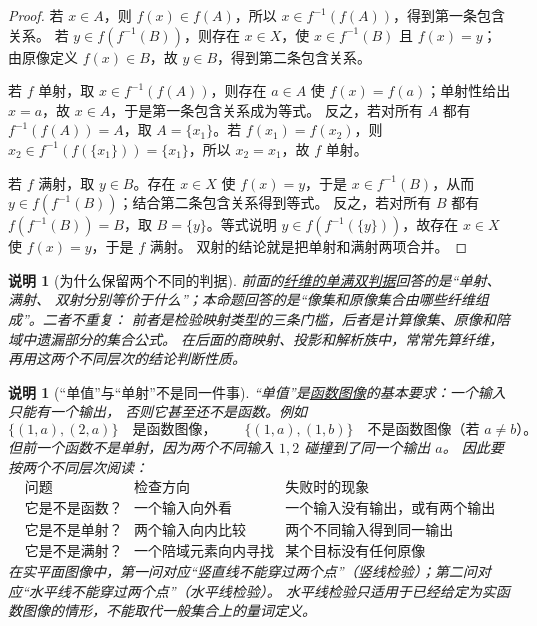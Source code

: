 \documentclass[UTF8,fontset=none,a4paper,11pt]{ctexart}
\theoremstyle{foundation-definition}
\theoremstyle{foundation-theorem}
\theoremstyle{foundation-proposition}
\theoremstyle{foundation-example}
\theoremstyle{foundation-remark}
\newtheorem{remark}[definition]{说明}
\theoremstyle{foundation-theorem}
\newcommand{\term}[2]{\hyperref[#1]{#2}}
\begin{document}
\begin{proof}
若 \(x\in A\)，则 \(f(x)\in f(A)\)，所以 \(x\in f^{-1}(f(A))\)，得到第一条包含关系。
若 \(y\in f(f^{-1}(B))\)，则存在 \(x\in X\)，使 \(x\in f^{-1}(B)\) 且 \(f(x)=y\)；
由原像定义 \(f(x)\in B\)，故 \(y\in B\)，得到第二条包含关系。

若 \(f\) 单射，取 \(x\in f^{-1}(f(A))\)，则存在 \(a\in A\) 使
\(f(x)=f(a)\)；单射性给出 \(x=a\)，故 \(x\in A\)，于是第一条包含关系成为等式。
反之，若对所有 \(A\) 都有 \(f^{-1}(f(A))=A\)，取
\(A=\{x_1\}\)。若 \(f(x_1)=f(x_2)\)，则
\(x_2\in f^{-1}(f(\{x_1\}))=\{x_1\}\)，所以 \(x_2=x_1\)，故 \(f\) 单射。

若 \(f\) 满射，取 \(y\in B\)。存在 \(x\in X\) 使 \(f(x)=y\)，于是
\(x\in f^{-1}(B)\)，从而 \(y\in f(f^{-1}(B))\)；结合第二条包含关系得到等式。
反之，若对所有 \(B\) 都有 \(f(f^{-1}(B))=B\)，取 \(B=\{y\}\)。等式说明
\(y\in f(f^{-1}(\{y\}))\)，故存在 \(x\in X\) 使 \(f(x)=y\)，于是 \(f\) 满射。
双射的结论就是把单射和满射两项合并。
\end{proof}

\begin{remark}[为什么保留两个不同的判据]
前面的\term{prop:fiber-single-surj-bijective}{纤维的单满双判据}回答的是“单射、满射、
双射分别等价于什么”；本命题回答的是“像集和原像集合由哪些纤维组成”。二者不重复：
前者是检验映射类型的三条门槛，后者是计算像集、原像和陪域中遗漏部分的集合公式。
在后面的商映射、投影和解析族中，常常先算纤维，再用这两个不同层次的结论判断性质。
\end{remark}

\begin{remark}[“单值”与“单射”不是同一件事]
“单值”是\term{def:function-graph-formal}{函数图像}的基本要求：一个输入只能有一个输出，
否则它甚至还不是函数。例如
\[
  \{(1,a),(2,a)\}\quad\text{是函数图像，}
  \qquad
  \{(1,a),(1,b)\}\quad\text{不是函数图像（若 }a\ne b\text{）。}
\]
但前一个函数不是单射，因为两个不同输入 \(1,2\) 碰撞到了同一个输出 \(a\)。
因此要按两个不同层次阅读：
\[
\begin{array}{c|c|c}
\text{问题}&\text{检查方向}&\text{失败时的现象}\\
\hline
\text{它是不是函数？}&\text{一个输入向外看}&\text{一个输入没有输出，或有两个输出}\\
\text{它是不是单射？}&\text{两个输入向内比较}&\text{两个不同输入得到同一输出}\\
\text{它是不是满射？}&\text{一个陪域元素向内寻找}&\text{某个目标没有任何原像}
\end{array}
\]
在实平面图像中，第一问对应“竖直线不能穿过两个点”（竖线检验）；第二问对应“水平线不能穿过两个点”（水平线检验）。
水平线检验只适用于已经给定为实函数图像的情形，不能取代一般集合上的量词定义。
\end{remark}
\end{document}
